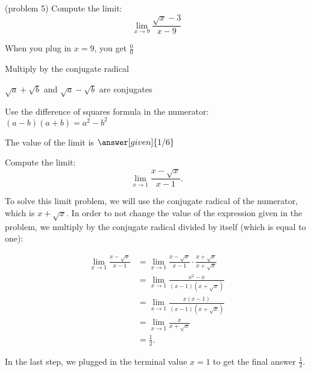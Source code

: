 \documentclass{ximera}
\begin{document}
\begin{problem}(problem 5)
  Compute the limit:
  \[
  \lim_{x \to 9} \frac{\sqrt{x}-3}{x-9}
  \]
  
    \begin{hint}
      When you plug in $x = 9$, you get $\frac00$
    \end{hint}
    \begin{hint}
      Multiply by the conjugate radical
    \end{hint}
    \begin{hint}
      $\sqrt a + \sqrt b$ and $\sqrt a - \sqrt b$ are conjugates
    \end{hint}
    \begin{hint}
      Use the difference of squares formula in the numerator: $(a-b)(a+b) = a^2 - b^2$ 
    \end{hint}
    
		The value of the limit is
		 $\answer[given]{1/6}$
		
\end{problem}



\begin{example}[example 6]
Compute the limit:
\[\lim_{x \to 1} \frac{x- \sqrt{x}}{x-1}.\]

To solve this limit problem, we will use the conjugate radical of the
numerator, which is $x+ \sqrt{x}$.  In order to not change the value of
the expression given in the problem, we multiply by the conjugate radical
divided by itself (which is equal to one):



\begin{align*}
\lim_{x \to 1} \frac{x- \sqrt{x}}{x-1} &=
\lim_{x \to 1} \frac{x- \sqrt{x}}{x-1}\cdot \frac{x+ \sqrt{x}}{x+ \sqrt{x}} \\
 &= \lim_{x \to 1} \frac{x^2- x}{(x-1)(x+ \sqrt{x})} \\
&= \lim_{x \to 1} \frac{x(x-1)}{(x-1)(x+ \sqrt{x})} \\
&= \lim_{x \to 1}\frac{x}{x+ \sqrt{x}} \\
&= \frac 12.
\end{align*}

In the last step, we plugged in the terminal value $x=1$ to get the final answer $\frac12$.

\end{example}
\end{document}
